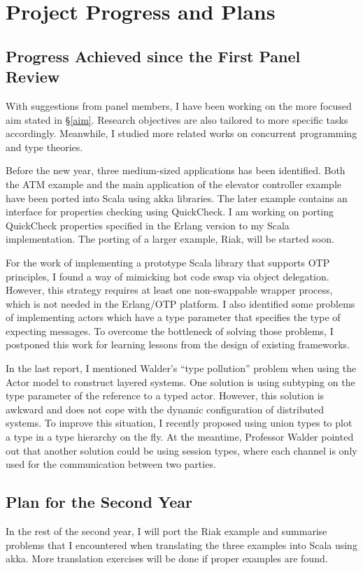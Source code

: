 \section{Project Progress and Plans}

\subsection{Progress Achieved since the First Panel Review}

With suggestions from panel members, I have been working on the more focused aim stated in \S\ref{aim}.  Research objectives are also tailored to more specific tasks accordingly.  Meanwhile, I studied more related works on concurrent programming and type theories.

Before the new year, three medium-sized applications has been identified.  Both the ATM example and the main application of the elevator controller example have been ported into Scala using akka libraries.  The later example contains an interface for properties checking using QuickCheck.  I am working on porting QuickCheck properties specified in the Erlang version to my Scala implementation.  The porting of a larger example, Riak, will be started soon.

For the work of implementing a prototype Scala library that supports OTP principles, I found a way of mimicking hot code swap via object delegation.  However, this strategy requires at least one non-swappable wrapper process, which is not needed in the Erlang/OTP platform.  I also identified some problems of implementing actors which have a type parameter that specifies the type of expecting messages.  To overcome the bottleneck of solving those problems, I postponed this work for learning lessons from the design of existing frameworks.

In the last report, I mentioned Walder's “type pollution” problem when using the Actor model to construct layered systems.  One solution is using subtyping on the type parameter of the reference to a typed actor.  However, this solution is awkward and does not cope with the dynamic configuration of distributed systems.  To improve this situation, I recently proposed using union types to plot a type in a type hierarchy on the fly. At the meantime, Professor Walder pointed out that another solution could be using session types, where each channel is only used for the communication between two parties.

\subsection{Plan for the Second Year}
In the rest of the second year, I will port the Riak example and summarise problems that I encountered when translating the three examples into Scala using akka.  More translation exercises will be done if proper examples are found.


